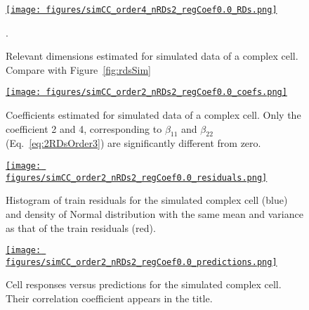 \documentclass[12pt]{article}
\begin{document}
\begin{figure}[H]
    \begin{center}
        \href{https://www.gatsby.ucl.ac.uk/~rapela/neuroinformatics/2023/ws6/figures/simCC_order4_nRDs2_regCoef0.0_RDs.html}{\texttt{[image: figures/simCC\_order4\_nRDs2\_regCoef0.0\_RDs.png]}}

        \caption{Relevant dimensions estimated for simulated data of a complex cell. Compare with Figure~\ref{fig:rdsSim}}.

        \label{fig:analysis_simCC_rds}
    \end{center}
\end{figure}

\begin{figure}[H]
    \begin{center}
        \href{https://www.gatsby.ucl.ac.uk/~rapela/neuroinformatics/2023/ws6/figures/simCC_order2_nRDs2_regCoef0.0_coefs.html}{\texttt{[image: figures/simCC\_order2\_nRDs2\_regCoef0.0\_coefs.png]}}

        \caption{Coefficients estimated for simulated data of a complex cell. Only the coefficient 2 and 4, corresponding to $\beta_{11}$ and $\beta_{22}$ (Eq.~\ref{eq:2RDsOrder3}) are significantly different from zero.}

        \label{fig:analysis_simCC_coefs}
    \end{center}
\end{figure}

\begin{figure}[H]
    \begin{center}
        \href{https://www.gatsby.ucl.ac.uk/~rapela/neuroinformatics/2023/ws6/figures/simCC_order2_nRDs2_regCoef0.0_residuals.html}{\texttt{[image: figures/simCC\_order2\_nRDs2\_regCoef0.0\_residuals.png]}}

        \caption{Histogram of train residuals for the simulated complex cell (blue) and density of Normal distribution with the same mean and variance as that of the train residuals (red).}

        \label{fig:analysis_simCC_histResiduals}
    \end{center}
\end{figure}

\begin{figure}[H]
    \begin{center}
        \href{https://www.gatsby.ucl.ac.uk/~rapela/neuroinformatics/2023/ws6/figures/simCC_order2_nRDs2_regCoef0.0_predictions.html}{\texttt{[image: figures/simCC\_order2\_nRDs2\_regCoef0.0\_predictions.png]}}

        \caption{Cell responses versus predictions for the simulated complex cell. Their correlation coefficient appears in the title.}

        \label{fig:analysis_simCC_fittedRes}
    \end{center}
\end{figure}
\end{document}
